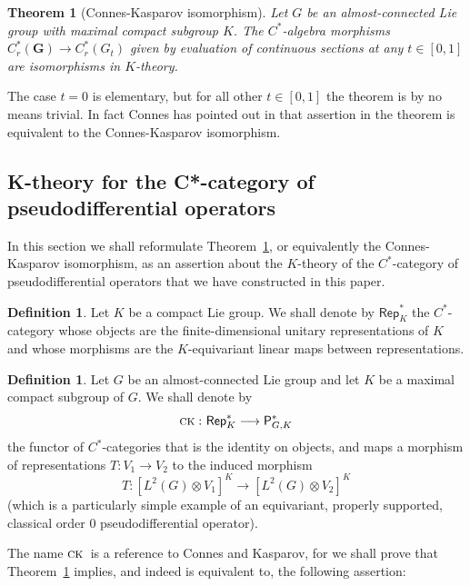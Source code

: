 \documentclass[leqno,11pt]{amsart}
\numberwithin{equation}{subsection}
\theoremstyle{plain}
\newtheorem{theorem}[equation]{Theorem}
\theoremstyle{definition}
\newtheorem{definition}[equation]{Definition}
\theoremstyle{remark}
\newcommand{\GG}{\pmb{G}}
\newcommand{\PSDO}{\mathsf{P}}
\newcommand{\Rep}{\mathsf{Rep}}
\newcommand{\CoKa}{{\textsc{\textsf{ck}}}\,}
\begin{document}
\begin{theorem}[Connes-Kasparov isomorphism]
\label{thm-dnc-formulation-of-connes-kasparov}
    Let $G$ be an almost-con\-nected Lie group with maximal compact subgroup $K$. The $C^*$-algebra morphisms $C^*_r(\GG ) \to C^*_r (G_t)$  given by evaluation of continuous sections at any $t\in [0,1]$ are isomorphisms in $K$-theory.
\end{theorem}

The case $t{=}0$ is elementary, but for all other $t{\in} [0,1]$ the theorem  is by no means trivial.  In fact Connes has pointed out in  \cite[Prop.~9,~p.141]{ConnesNCG} that assertion in the theorem is equivalent to the Connes-Kasparov isomorphism.  





\subsection{K-theory for the  C*-category of pseudodifferential operators} 
\label{sec-k-theory-for-psdo-category}
In this section we shall reformulate Theorem~\ref{thm-dnc-formulation-of-connes-kasparov}, or equivalently the Connes-Kasparov isomorphism, as an assertion about the $K$-theory of the $C^*$-cat\-egory of pseudodifferential operators that we have constructed in this paper.

\begin{definition}
Let $K$ be a compact Lie group. We shall denote by $\Rep^*_K$ the $C^*$-category whose objects are the finite-dimen\-sional unitary representations of   $K$ and whose morphisms are the $K$-equivariant linear maps between representations.
\end{definition} 

\begin{definition} 
\label{def-connes-kasparov-functor}
Let $G$ be an almost-connected Lie group and let $K$ be a maximal compact subgroup of $G$. We shall denote by  
\[
\CoKa \colon \Rep^*_K \longrightarrow \PSDO^*_{G,K}
\]
the functor of $C^*$-categories that is the identity on objects, and   maps a morphism of representations 
$T\colon V_1\to V_2$ to the induced morphism 
\[
T \colon [L^2( G)\otimes V_1]^K \longrightarrow  [L^2( G)\otimes V_2]^K
\]
(which is a particularly simple example of an equivariant, properly supported, classical order $0$ pseudodifferential operator). 
\end{definition}

The name $\CoKa$ is a reference to Connes and Kasparov, for we shall prove that Theorem~\ref{thm-dnc-formulation-of-connes-kasparov} implies, and indeed is equivalent to, the following assertion: 
\end{document}
